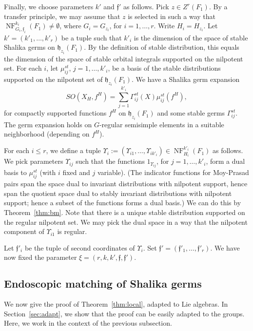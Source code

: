 \documentclass[12pt]{amsart}
\newcommand{\op}[1]{\operatorname{#1}}
\def\NF{\op{NF}}
\def\Y{\Upsilon}
\def\s{{\mathfrak{f}}}
\newcommand{\fh}{\mathfrak{h}}
\theoremstyle{plain}
\theoremstyle{definition}
\begin{document}
Finally, we choose parameters $k'$ and $\s'$ as follows.  Pick $z\in
Z^r(F_1)$.  By a transfer principle, we may assume that $z$ is
selected in such a way that $\NF^{k_i}_{G_i,\s_i}(F_1)\ne \emptyset$,
where $G_i=G_{z_i}$, for $i=1,\ldots,r$.  Write $H_i = H_{z_i}$. Let
$k'=(k'_1,\ldots,k'_r)$ be a tuple such that $k'_i$ is the dimension
of the space of stable Shalika germs on $\fh_{z_i}(F_1)$.  By the
definition of stable distribution, this equals the dimension of the
space of stable orbital integrals supported on the nilpotent set.  For
each $i$, let $\mu_{ij}^{st}$, $j = 1,\ldots,k'_i$, be a basis of the
stable distributions supported on the nilpotent set of $\fh_{z_i}(F_1)$.
We have a Shalika germ expansion
\[
SO(X_H,f^H) = \sum_{j=1}^{k'_i} \Gamma^{st}_{ij}(X) \mu_{ij}^{st}(f^H),
\]
for compactly supported functions $f^H$ on $\fh_{z_i}(F_1)$ and some
stable germs $\Gamma^{st}_{ij}$.  The germ expansion holds on $G$-regular
semisimple elements in a suitable neighborhood (depending on $f^H$).

For each $i\le r$, we define a tuple $\Y_i :=
(\Y_{i1},\ldots,\Y_{ik'_i})\in \NF^{k'_i}_{H_{i}}(F_1)$ as follows.
We pick parameters $\Y_{ij}$ such that the functions $1_{\Y_{ij}}$,
for $j=1,\ldots,k'_i$, form a dual basis to $\mu_{ij}^{st}$ (with $i$
fixed and $j$ variable).  (The indicator functions for Moy-Prasad
pairs span the space dual to invariant distributions with nilpotent
support, hence span the quotient space dual to stably invariant
distributions with nilpotent support; hence a subset of the functions
forms a dual basis.)  We can do this by Theorem~\ref{thm:bm}.  Note
that there is a unique stable distribution supported on the regular
nilpotent set.  We may pick the dual space in a way that the nilpotent
component of $\Y_{i1}$ is regular.

Let $\s'_i$ be the tuple of second coordinates of $\Y_i$.
Set $\s' = (\s'_1,\ldots,\s'_r)$.  We have now fixed the parameter
$\xi=(r,k,k',\s,\s')$.
 
\subsection{Endoscopic matching of Shalika germs}\label{sec:emsg}

We now give the proof of Theorem~\ref{thm:local}, adapted to Lie
algebras.  In Section~\ref{sec:adapt}, we show that the proof can be
easily adapted to the groups.  Here, we work in the context of the
previous subsection.
\end{document}
